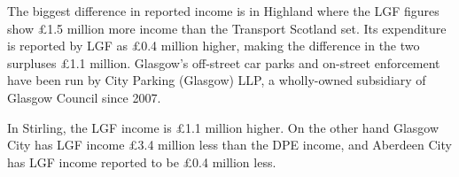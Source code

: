 \documentclass[
  12pt,
]{article}
\begin{document}
The biggest difference in reported income is in Highland where the LGF figures show £1.5 million more income than the Transport Scotland set. Its expenditure is reported by LGF as £0.4 million higher, making the difference in the two surpluses £1.1 million. Glasgow's off-street car parks and on-street enforcement have been run by City Parking (Glasgow) LLP, a wholly-owned subsidiary of Glasgow Council since 2007.

In Stirling, the LGF income is £1.1 million higher. On the other hand Glasgow City has LGF income £3.4 million less than the DPE income, and Aberdeen City has LGF income reported to be £0.4 million less.

\newpage
\begin{landscape}
\begin{table}[H]


\end{table}
\end{landscape}
\end{document}
